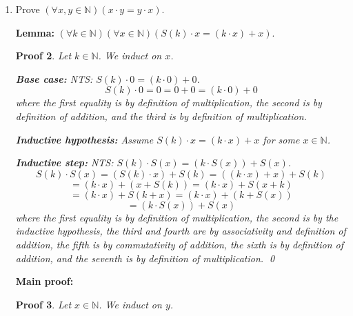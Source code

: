 \documentclass[12pt]{article}
\theoremstyle{proofstyle}
\newtheorem*{proof*}{Proof}
\begin{document}
\begin{enumerate}[left=0pt, itemsep=2em, parsep=1em]
\begin{proof*}
    \textbf{Inductive hypothesis:} Assume $x \cdot (y + k) = (x \cdot y) + (x \cdot k)$
    for some $k \in \mathbb{N}$.

    \textbf{Inductive step:} NTS: $x \cdot (y + S(k)) = (x \cdot y) + (x \cdot S(k))$.
    \[
        x \cdot (y + S(k)) = x \cdot S(y + k) = (x \cdot (y + k)) + x
        = ((x \cdot y) + (x \cdot k)) + x
    \]
    \[
        = (x \cdot y) + ((x \cdot k) + x) = (x \cdot y) + (x \cdot S(k))
    \]
    where the first equality is by definition of addition, the second is by
    definition of multiplication, the third is by the inductive hypothesis,
    the fourth is by associativity of addition, and the fifth is by
    definition of multiplication. \qed
\end{proof*}

\item Prove $(\forall x, y \in \mathbb{N})(x \cdot y = y \cdot x)$.

\textbf{Lemma:} $(\forall k \in \mathbb{N})(\forall x \in \mathbb{N})(S(k) \cdot x = (k \cdot x) + x)$.

\begin{proof*}
    Let $k \in \mathbb{N}$. We induct on $x$.

    \textbf{Base case:} NTS: $S(k) \cdot 0 = (k \cdot 0) + 0$.
    \[
        S(k) \cdot 0 = 0 = 0 + 0 = (k \cdot 0) + 0
    \]
    where the first equality is by definition of multiplication, the second
    is by definition of addition, and the third is by definition of
    multiplication.

    \textbf{Inductive hypothesis:} Assume $S(k) \cdot x = (k \cdot x) + x$
    for some $x \in \mathbb{N}$.

    \textbf{Inductive step:} NTS: $S(k) \cdot S(x) = (k \cdot S(x)) + S(x)$.
    \[
        S(k) \cdot S(x) = (S(k) \cdot x) + S(k) = ((k \cdot x) + x) + S(k)
    \]
    \[
        = (k \cdot x) + (x + S(k)) = (k \cdot x) + S(x + k)
    \]
    \[
        = (k \cdot x) + S(k + x) = (k \cdot x) + (k + S(x))
    \]
    \[
        = (k \cdot S(x)) + S(x)
    \]
    where the first equality is by definition of multiplication, the second
    is by the inductive hypothesis, the third and fourth are by associativity
    and definition of addition, the fifth is by commutativity of addition,
    the sixth is by definition of addition, and the seventh is by definition
    of multiplication. \qed
\end{proof*}

\textbf{Main proof:}

\begin{proof*}
    Let $x \in \mathbb{N}$. We induct on $y$.


\end{proof*}
\end{enumerate}
\end{document}
